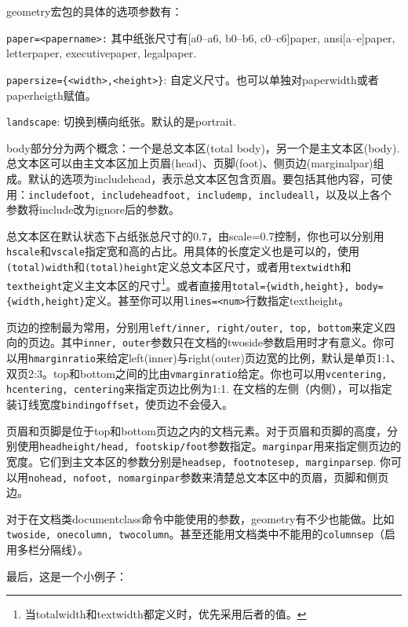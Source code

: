 {geometry宏包的具体的选项参数有：
\begin{feai}
\item \texttt{paper=<papername>:} 其中纸张尺寸有[a0--a6, b0--b6, c0--c6]paper, ansi[a--e]paper, letterpaper, executivepaper, legalpaper. 
\item \texttt{papersize=\{<width>,<height>\}}: 自定义尺寸。也可以单独对paperwidth或者paperheigth赋值。
\item \texttt{landscape}: 切换到横向纸张。默认的是portrait. 
\end{feai}

body部分分为两个概念：一个是总文本区(total body)，另一个是主文本区(body). 总文本区可以由主文本区加上页眉(head)、页脚(foot)、侧页边(marginalpar)组成。默认的选项为includehead，表示总文本区包含页眉。要包括其他内容，可使用：\texttt{includefoot, includeheadfoot, includemp, includeall}，以及以上各个参数将include改为ignore后的参数。

总文本区在默认状态下占纸张总尺寸的0.7，由scale=0.7控制，你也可以分别用\texttt{hscale}和\texttt{vscale}指定宽和高的占比。用具体的长度定义也是可以的，使用\texttt{(total)width}和\texttt{(total)height}定义总文本区尺寸，或者用\texttt{textwidth}和\texttt{textheight}定义主文本区的尺寸\footnote{当totalwidth和textwidth都定义时，优先采用后者的值。}。或者直接用\texttt{total=\{width,height\}, body=\{width,height\}}定义。甚至你可以用\texttt{lines=<num>}行数指定textheight。

页边的控制最为常用，分别用\texttt{left/inner, right/outer, top, bottom}来定义四向的页边。其中\texttt{inner, outer}参数只在文档的twoside参数启用时才有意义。你可以用\texttt{hmarginratio}来给定left(inner)与right(outer)页边宽的比例，默认是单页1:1、双页2:3。top和bottom之间的比由\texttt{vmarginratio}给定。你也可以用\texttt{vcentering, hcentering, centering}来指定页边比例为1:1. 在文档的左侧（内侧），可以指定装订线宽度\texttt{bindingoffset}，使页边不会侵入。

页眉和页脚是位于top和bottom页边之内的文档元素。对于页眉和页脚的高度，分别使用\texttt{headheight/head, footskip/foot}参数指定。\texttt{marginpar}用来指定侧页边的宽度。它们到主文本区的参数分别是\texttt{headsep, footnotesep, marginparsep}. 你可以用\texttt{nohead, nofoot, nomarginpar}参数来清楚总文本区中的页眉，页脚和侧页边。

对于在文档类documentclass命令中能使用的参数，geometry有不少也能做。比如\texttt{twoside, onecolumn, twocolumn}。甚至还能用文档类中不能用的\texttt{columnsep}（启用多栏分隔线）。

最后，这是一个小例子：
\begin{latex}{}
\usepackage[marginpar=3cm, includemp]{package}
\end{latex}

}
